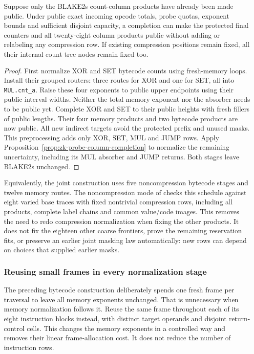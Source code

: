 \begin{corollary}\label{cor:zk-noncompression-completion}
Suppose only the BLAKE2s count-column products have already been made public. Under public exact incoming opcode totals, probe quotas, exponent bounds and sufficient disjoint capacity, a completion can make the protected final counters and all twenty-eight column products public without adding or relabeling any compression row. If existing compression positions remain fixed, all their internal count-tree nodes remain fixed too.
\end{corollary}
\begin{proof}
First normalize XOR and SET bytecode counts using fresh-memory loops. Install their grouped routers: three routes for XOR and one for SET, all into \texttt{MUL.cnt\_a}. Raise these four exponents to public upper endpoints using their public interval widths. Neither the total memory exponent nor the absorber needs to be public yet. Complete XOR and SET to their public heights with fresh fillers of public lengths. Their four memory products and two bytecode products are now public. All new indirect targets avoid the protected prefix and unused masks. This preprocessing adds only XOR, SET, MUL and JUMP rows. Apply Proposition~\ref{prop:zk-probe-column-completion} to normalize the remaining uncertainty, including its MUL absorber and JUMP returns. Both stages leave BLAKE2s unchanged.
\end{proof}

Equivalently, the joint construction uses five noncompression bytecode stages and twelve memory routes. The noncompression mode of  checks this schedule against eight varied base traces with fixed nontrivial compression rows, including all products, complete label chains and common value/code images. This removes the need to redo compression normalization when fixing the other products. It does not fix the eighteen other coarse frontiers, prove the remaining reservation fits, or preserve an earlier joint masking law automatically: new rows can depend on choices that supplied earlier masks.

\subsubsection{Reusing small frames in every normalization stage}

The preceding bytecode construction deliberately spends one fresh frame per traversal to leave all memory exponents unchanged. That is unnecessary when memory normalization follows it. Reuse the same frame throughout each of its eight instruction blocks instead, with distinct target operands and disjoint return-control cells. This changes the memory exponents in a controlled way and removes their linear frame-allocation cost. It does not reduce the number of instruction rows.

